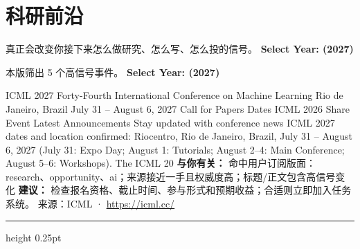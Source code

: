 \documentclass[10.5pt]{ctexart}
\begin{document}
\section*{科研前沿}
{\color{ormuted} 真正会改变你接下来怎么做研究、怎么写、怎么投的信号。}
\vspace{2mm}
{\LARGE\bfseries Select Year: (2027)}\par
\vspace{1mm}
{\color{ormuted} 本版筛出 5 个高信号事件。}
\vspace{3mm}
{\Large\bfseries Select Year: (2027)}\par
ICML 2027 Forty-Fourth International Conference on Machine Learning Rio de Janeiro, Brazil July 31 – August 6, 2027 Call for Papers Dates ICML 2026 Share Event Latest Announcements Stay updated with conference news ICML 2027 dates and location confirmed: Riocentro, Rio de Janeiro, Brazil, July 31 – August 6, 2027 (July 31: Expo Day; August 1: Tutorials; August 2–4: Main Conference; August 5–6: Workshops). The ICML 20
\textbf{与你有关：} 命中用户订阅版面：research、opportunity、ai；来源接近一手且权威度高；标题/正文包含高信号变化
\textbf{建议：} 检查报名资格、截止时间、参与形式和预期收益；合适则立即加入任务系统。
{\footnotesize\color{ormuted} 来源：ICML · \url{https://icml.cc/}}
\vspace{4mm}
\hrule height 0.25pt
\vspace{3mm}
\end{document}
